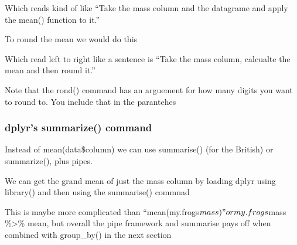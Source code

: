 \documentclass[]{book}
\newenvironment{Shaded}{\begin{snugshade}}{\end{snugshade}}
\newcommand{\KeywordTok}[1]{\textcolor[rgb]{0.13,0.29,0.53}{\textbf{#1}}}
\newcommand{\DataTypeTok}[1]{\textcolor[rgb]{0.13,0.29,0.53}{#1}}
\newcommand{\DecValTok}[1]{\textcolor[rgb]{0.00,0.00,0.81}{#1}}
\newcommand{\StringTok}[1]{\textcolor[rgb]{0.31,0.60,0.02}{#1}}
\newcommand{\OperatorTok}[1]{\textcolor[rgb]{0.81,0.36,0.00}{\textbf{#1}}}
\newcommand{\NormalTok}[1]{#1}
\theoremstyle{definition}
\theoremstyle{definition}
\theoremstyle{definition}
\theoremstyle{remark}
\begin{document}
Which reads kind of like ``Take the mass column and the datagrame and
apply the mean() function to it.''

To round the mean we would do this

\begin{Shaded}
\end{Shaded}

Which read left to right like a sentence is ``Take the mass column,
calcualte the mean and then round it.''

Note that the rond() command has an arguement for how many digits you
want to round to. You include that in the parantehes

\begin{Shaded}
\end{Shaded}

\subsubsection{dplyr's summarize()
command}\label{dplyrs-summarize-command}

Instead of mean(data\$column) we can use summarise() (for the British)
or summarize(), plus pipes.

We can get the grand mean of just the mass column by loading dplyr using
library() and then using the summarise() commnad

\begin{Shaded}
\end{Shaded}

This is maybe more complicated than
``mean(my.frogs\(mass)" or my.frogs\)mass \%\textgreater{}\% mean, but
overall the pipe framework and summarise pays off when combined with
group\_by() in the next section
\end{document}

